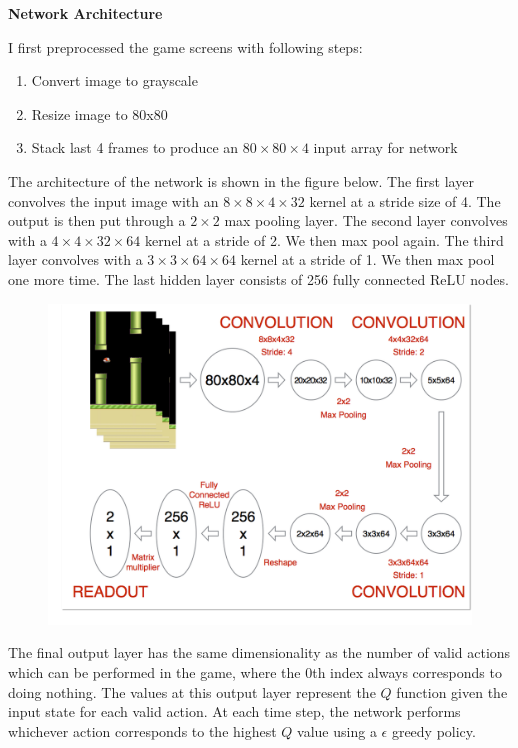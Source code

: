 \documentclass[a4paper, 11pt]{article}
\begin{document}
\textbf{Network Architecture}

I first preprocessed the game screens with following steps:

\begin{enumerate}
\itemsep1pt\parskip0pt
\item
  Convert image to grayscale
\item
  Resize image to 80x80
\item
  Stack last 4 frames to produce an $80\times 80\times 4$ input array for network
\end{enumerate}

The architecture of the network is shown in the figure below. The first
layer convolves the input image with an $8\times 8\times 4\times 32$ kernel at a stride size
of 4. The output is then put through a $2\times 2$ max pooling layer. The second
layer convolves with a $4\times 4\times 32\times 64$ kernel at a stride of 2. We then max
pool again. The third layer convolves with a $3\times 3\times 64\times 64$ kernel at a
stride of 1. We then max pool one more time. The last hidden layer consists of 256 fully connected ReLU nodes.
\begin{figure}[ht]
\centering
\includegraphics[width=16cm]{Pic/network}
\end{figure}

The final output layer has the same dimensionality as the number of valid actions which can be performed in the game, where the 0th index always corresponds to doing nothing. The values at this output layer
represent the $Q$ function given the input state for each valid action. At each time step, the network performs whichever action corresponds to the highest $Q$ value using a $\epsilon$ greedy policy.
\end{document}
